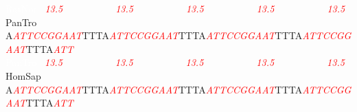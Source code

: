 \documentclass[11pt,twoside,reqno,a4paper]{article}
\begin{document}
{\textcolor{white}{RatNor	}\ \textit{\textcolor{red}{13.5}}\ \ \ \ \ \ \ \ \ \ \ \textit{\textcolor{red}{13.5}}\ \ \ \ \ \ \ \ \ \ \ \textit{\textcolor{red}{13.5}}\ \ \ \ \ \ \ \ \ \ \ \textit{\textcolor{red}{13.5}}\ \ \ \ \ \ \ \ \ \ \ \textit{\textcolor{red}{13.5}}\\
PanTro	A\textit{\textcolor{red}{A}}\textit{\textcolor{red}{T}}\textit{\textcolor{red}{T}}\textit{\textcolor{red}{C}}\textit{\textcolor{red}{C}}\textit{\textcolor{red}{G}}\textit{\textcolor{red}{G}}\textit{\textcolor{red}{A}}\textit{\textcolor{red}{A}}\textit{\textcolor{red}{T}}TTTA\textit{\textcolor{red}{A}}\textit{\textcolor{red}{T}}\textit{\textcolor{red}{T}}\textit{\textcolor{red}{C}}\textit{\textcolor{red}{C}}\textit{\textcolor{red}{G}}\textit{\textcolor{red}{G}}\textit{\textcolor{red}{A}}\textit{\textcolor{red}{A}}\textit{\textcolor{red}{T}}TTTA\textit{\textcolor{red}{A}}\textit{\textcolor{red}{T}}\textit{\textcolor{red}{T}}\textit{\textcolor{red}{C}}\textit{\textcolor{red}{C}}\textit{\textcolor{red}{G}}\textit{\textcolor{red}{G}}\textit{\textcolor{red}{A}}\textit{\textcolor{red}{A}}\textit{\textcolor{red}{T}}TTTA\textit{\textcolor{red}{A}}\textit{\textcolor{red}{T}}\textit{\textcolor{red}{T}}\textit{\textcolor{red}{C}}\textit{\textcolor{red}{C}}\textit{\textcolor{red}{G}}\textit{\textcolor{red}{G}}\textit{\textcolor{red}{A}}\textit{\textcolor{red}{A}}\textit{\textcolor{red}{T}}TTTA\textit{\textcolor{red}{A}}\textit{\textcolor{red}{T}}\textit{\textcolor{red}{T}}\\
\textcolor{white}{PanTro	}\ \textit{\textcolor{red}{13.5}}\ \ \ \ \ \ \ \ \ \ \ \textit{\textcolor{red}{13.5}}\ \ \ \ \ \ \ \ \ \ \ \textit{\textcolor{red}{13.5}}\ \ \ \ \ \ \ \ \ \ \ \textit{\textcolor{red}{13.5}}\ \ \ \ \ \ \ \ \ \ \ \textit{\textcolor{red}{13.5}}\\
HomSap	A\textit{\textcolor{red}{A}}\textit{\textcolor{red}{T}}\textit{\textcolor{red}{T}}\textit{\textcolor{red}{C}}\textit{\textcolor{red}{C}}\textit{\textcolor{red}{G}}\textit{\textcolor{red}{G}}\textit{\textcolor{red}{A}}\textit{\textcolor{red}{A}}\textit{\textcolor{red}{T}}TTTA\textit{\textcolor{red}{A}}\textit{\textcolor{red}{T}}\textit{\textcolor{red}{T}}\textit{\textcolor{red}{C}}\textit{\textcolor{red}{C}}\textit{\textcolor{red}{G}}\textit{\textcolor{red}{G}}\textit{\textcolor{red}{A}}\textit{\textcolor{red}{A}}\textit{\textcolor{red}{T}}TTTA\textit{\textcolor{red}{A}}\textit{\textcolor{red}{T}}\textit{\textcolor{red}{T}}\textit{\textcolor{red}{C}}\textit{\textcolor{red}{C}}\textit{\textcolor{red}{G}}\textit{\textcolor{red}{G}}\textit{\textcolor{red}{A}}\textit{\textcolor{red}{A}}\textit{\textcolor{red}{T}}TTTA\textit{\textcolor{red}{A}}\textit{\textcolor{red}{T}}\textit{\textcolor{red}{T}}\textit{\textcolor{red}{C}}\textit{\textcolor{red}{C}}\textit{\textcolor{red}{G}}\textit{\textcolor{red}{G}}\textit{\textcolor{red}{A}}\textit{\textcolor{red}{A}}\textit{\textcolor{red}{T}}TTTA\textit{\textcolor{red}{A}}\textit{\textcolor{red}{T}}\textit{\textcolor{red}{T}}\\
}
\end{document}
